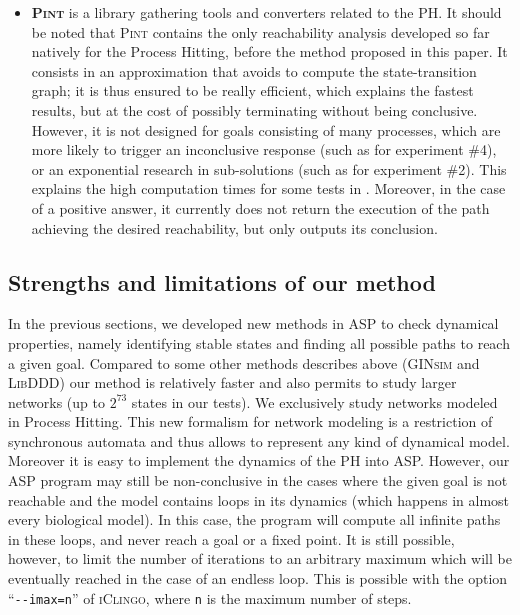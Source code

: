 \begin{itemize}
\item \textbf{\textsc{Pint}}
is a library gathering tools and converters related to the PH.
It should be noted that \textsc{Pint} contains the only reachability analysis
developed so far natively for the Process Hitting,
before the method proposed in this paper.
It consists in an approximation that avoids to compute the state-transition graph;
it is thus ensured to be really efficient, which explains the fastest results,
but at the cost of possibly terminating without being conclusive.
However, it is not designed for goals consisting of many processes,
which are more likely to trigger an inconclusive response
(such as for experiment \#4),
or an exponential research in sub-solutions
(such as for experiment \#2).
This explains the high computation times for some tests in .
Moreover, in the case of a positive answer,
it currently does not return the execution of the path achieving the desired reachability,
but only outputs its conclusion.
\end{itemize}

\subsection{Strengths and limitations of our method}
\label{sec:limitations}

In the previous sections,
we developed new methods in ASP to check dynamical properties,
namely identifying stable states and finding all possible paths to reach a given goal.
Compared to some other methods describes above
(\textsc{GINsim} and \textsc{LibDDD}) our method is relatively faster and also permits to study larger networks
(up to $2^{73}$ states in our tests). We exclusively study networks modeled in Process Hitting. This new formalism for network modeling is a restriction of synchronous automata and thus allows to represent any kind of dynamical model. Moreover it is easy to implement the dynamics of the PH into ASP.
However, our ASP program may still be non-conclusive
in the cases where the given goal is not
reachable and the model contains loops in its dynamics
(which happens in almost every biological model).
In this case, the program will compute all infinite paths in these loops,
and never reach a goal or a fixed point.
It is still possible, however, to limit the number of iterations to an arbitrary
maximum which will be eventually reached in the case of an endless loop.
This is possible with the option ``\texttt{-{}-imax=n}'' of \textsc{iClingo},
where \texttt{n} is the maximum number of steps.

